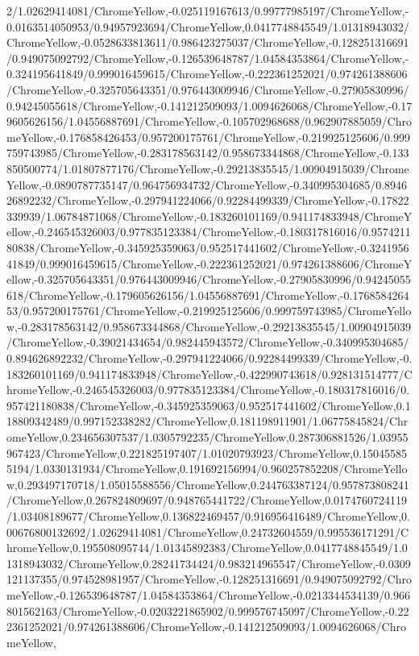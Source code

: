 {\begin{tikzternal}
{2/1.02629414081/ChromeYellow,-0.025119167613/0.99777985197/ChromeYellow,-0.0163514050953/0.94957923694/ChromeYellow,0.0417748845549/1.01318943032/ChromeYellow,-0.0528633813611/0.986423275037/ChromeYellow,-0.128251316691/0.949075092792/ChromeYellow,-0.126539648787/1.04584353864/ChromeYellow,-0.324195641849/0.999016459615/ChromeYellow,-0.222361252021/0.974261388606/ChromeYellow,-0.325705643351/0.976443009946/ChromeYellow,-0.27905830996/0.94245055618/ChromeYellow,-0.141212509093/1.0094626068/ChromeYellow,-0.179605626156/1.04556887691/ChromeYellow,-0.105702968688/0.962907885059/ChromeYellow,-0.176858426453/0.957200175761/ChromeYellow,-0.219925125606/0.999759743985/ChromeYellow,-0.283178563142/0.958673344868/ChromeYellow,-0.133850500774/1.01807877176/ChromeYellow,-0.29213835545/1.00904915039/ChromeYellow,-0.0890787735147/0.964756934732/ChromeYellow,-0.340995304685/0.894626892232/ChromeYellow,-0.297941224066/0.92284499339/ChromeYellow,-0.17822339939/1.06784871068/ChromeYellow,-0.183260101169/0.941174833948/ChromeYellow,-0.246545326003/0.977835123384/ChromeYellow,-0.180317816016/0.957421180838/ChromeYellow,-0.345925359063/0.952517441602/ChromeYellow,-0.324195641849/0.999016459615/ChromeYellow,-0.222361252021/0.974261388606/ChromeYellow,-0.325705643351/0.976443009946/ChromeYellow,-0.27905830996/0.94245055618/ChromeYellow,-0.179605626156/1.04556887691/ChromeYellow,-0.176858426453/0.957200175761/ChromeYellow,-0.219925125606/0.999759743985/ChromeYellow,-0.283178563142/0.958673344868/ChromeYellow,-0.29213835545/1.00904915039/ChromeYellow,-0.39021434654/0.982445943572/ChromeYellow,-0.340995304685/0.894626892232/ChromeYellow,-0.297941224066/0.92284499339/ChromeYellow,-0.183260101169/0.941174833948/ChromeYellow,-0.422990743618/0.928131514777/ChromeYellow,-0.246545326003/0.977835123384/ChromeYellow,-0.180317816016/0.957421180838/ChromeYellow,-0.345925359063/0.952517441602/ChromeYellow,0.118809342489/0.997152338282/ChromeYellow,0.181198911901/1.06775845824/ChromeYellow,0.234656307537/1.0305792235/ChromeYellow,0.287306881526/1.03955967423/ChromeYellow,0.221825197407/1.01020793923/ChromeYellow,0.150455855194/1.0330131934/ChromeYellow,0.191692156994/0.960257852208/ChromeYellow,0.293497170718/1.05015588556/ChromeYellow,0.244763387124/0.957873808241/ChromeYellow,0.267824809697/0.948765441722/ChromeYellow,0.0174760724119/1.03408189677/ChromeYellow,0.136822469457/0.916956416489/ChromeYellow,0.00676800132692/1.02629414081/ChromeYellow,0.24732604559/0.995536171291/ChromeYellow,0.195508095744/1.01345892383/ChromeYellow,0.0417748845549/1.01318943032/ChromeYellow,0.28241734424/0.983214965547/ChromeYellow,-0.0309121137355/0.974528981957/ChromeYellow,-0.128251316691/0.949075092792/ChromeYellow,-0.126539648787/1.04584353864/ChromeYellow,-0.0213344534139/0.966801562163/ChromeYellow,-0.0203221865902/0.999576745097/ChromeYellow,-0.222361252021/0.974261388606/ChromeYellow,-0.141212509093/1.0094626068/ChromeYellow,
}
\end{tikzternal}}
